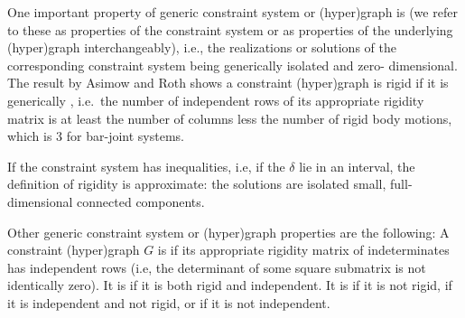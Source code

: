 
One important property of generic constraint system or (hyper)graph
is  (\note we refer to these as properties of
the constraint system or as properties of the underlying (hyper)graph
interchangeably), i.e., the realizations or solutions of the
corresponding constraint system being generically isolated and zero-
dimensional.%
The result by Asimow and Roth \cite{asimow1978rigidity}  shows a constraint
(hyper)graph is rigid if it is generically , i.e.\ the number of independent rows of its appropriate
rigidity matrix is at least the number of columns less the number of
rigid body motions, which is 3 for bar-joint systems.

\noindent
\note If the constraint system has inequalities, i.e, if the $\delta$
lie in an interval, the definition of rigidity is approximate: the
solutions are isolated small, full-dimensional  connected components.

Other generic constraint system or (hyper)graph properties are the
following:
A constraint (hyper)graph $G$ is  if its appropriate
rigidity matrix of indeterminates has independent rows (i.e, the
determinant of some square submatrix is not identically zero).
It is  if it is
both rigid and independent.
It is  if it is not rigid,  if it
is independent and not rigid, or  if it is not
independent.

